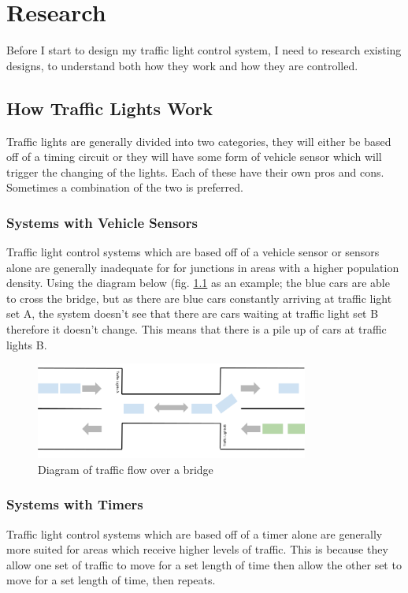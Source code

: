 \chapter{Research}
Before I start to design my traffic light control system, I need to research existing designs, to understand both how they work and how they are controlled.

\section{How Traffic Lights Work}
Traffic lights are generally divided into two categories, they will either be based off of a timing circuit or they will have some form of vehicle sensor which will trigger the changing of the lights. Each of these have their own pros and cons. Sometimes a combination of the two is preferred.

\subsection{Systems with Vehicle Sensors}
Traffic light control systems which are based off of a vehicle sensor or sensors alone are generally inadequate for for junctions in areas with a higher population density. Using the diagram below (fig. \ref{fig:bridgeDiagram} as an example; the blue cars are able to cross the bridge, but as there are blue cars constantly arriving at traffic light set A, the system doesn't see that there are cars waiting at traffic light set B therefore it doesn't change. This means that there is a pile up of cars at traffic lights B.
\begin{figure}[H]
    \centering
    \includegraphics[width=0.8\textwidth]{images/Bridge diagram.png}
    \caption{Diagram of traffic flow over a bridge}
    \label{fig:bridgeDiagram}
\end{figure}

\subsection{Systems with Timers}
Traffic light control systems which are based off of a timer alone are generally more suited for areas which receive higher levels of traffic. This is because they allow one set of traffic to move for a set length of time then allow the other set to move for a set length of time, then repeats.


